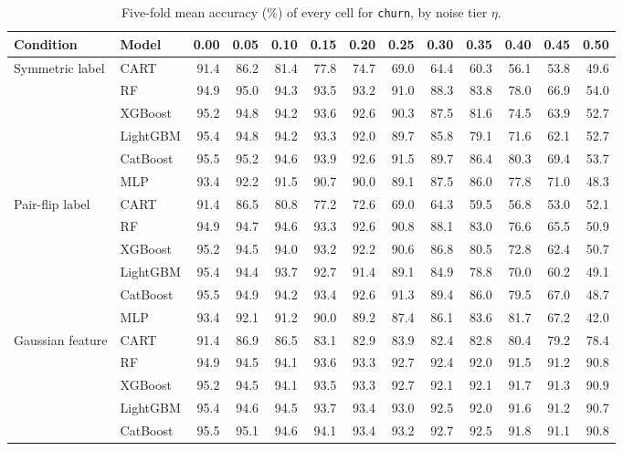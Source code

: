 \begin{table}[p]
\centering
\tiny
\setlength{\tabcolsep}{2.6pt}
\caption{Five-fold mean accuracy (\%) of every cell for \texttt{churn}, by noise tier $\eta$.}
\label{tab:grid_churn}
\begin{tabular}{@{}llrrrrrrrrrrr@{}}
\toprule
Condition & Model & 0.00 & 0.05 & 0.10 & 0.15 & 0.20 & 0.25 & 0.30 & 0.35 & 0.40 & 0.45 & 0.50 \\
\midrule
Symmetric label & CART & 91.4 & 86.2 & 81.4 & 77.8 & 74.7 & 69.0 & 64.4 & 60.3 & 56.1 & 53.8 & 49.6 \\
 & RF & 94.9 & 95.0 & 94.3 & 93.5 & 93.2 & 91.0 & 88.3 & 83.8 & 78.0 & 66.9 & 54.0 \\
 & XGBoost & 95.2 & 94.8 & 94.2 & 93.6 & 92.6 & 90.3 & 87.5 & 81.6 & 74.5 & 63.9 & 52.7 \\
 & LightGBM & 95.4 & 94.8 & 94.2 & 93.3 & 92.0 & 89.7 & 85.8 & 79.1 & 71.6 & 62.1 & 52.7 \\
 & CatBoost & 95.5 & 95.2 & 94.6 & 93.9 & 92.6 & 91.5 & 89.7 & 86.4 & 80.3 & 69.4 & 53.7 \\
 & MLP & 93.4 & 92.2 & 91.5 & 90.7 & 90.0 & 89.1 & 87.5 & 86.0 & 77.8 & 71.0 & 48.3 \\
\midrule
Pair-flip label & CART & 91.4 & 86.5 & 80.8 & 77.2 & 72.6 & 69.0 & 64.3 & 59.5 & 56.8 & 53.0 & 52.1 \\
 & RF & 94.9 & 94.7 & 94.6 & 93.3 & 92.6 & 90.8 & 88.1 & 83.0 & 76.6 & 65.5 & 50.9 \\
 & XGBoost & 95.2 & 94.5 & 94.0 & 93.2 & 92.2 & 90.6 & 86.8 & 80.5 & 72.8 & 62.4 & 50.7 \\
 & LightGBM & 95.4 & 94.4 & 93.7 & 92.7 & 91.4 & 89.1 & 84.9 & 78.8 & 70.0 & 60.2 & 49.1 \\
 & CatBoost & 95.5 & 94.9 & 94.2 & 93.4 & 92.6 & 91.3 & 89.4 & 86.0 & 79.5 & 67.0 & 48.7 \\
 & MLP & 93.4 & 92.1 & 91.2 & 90.0 & 89.2 & 87.4 & 86.1 & 83.6 & 81.7 & 67.2 & 42.0 \\
\midrule
Gaussian feature & CART & 91.4 & 86.9 & 86.5 & 83.1 & 82.9 & 83.9 & 82.4 & 82.8 & 80.4 & 79.2 & 78.4 \\
 & RF & 94.9 & 94.5 & 94.1 & 93.6 & 93.3 & 92.7 & 92.4 & 92.0 & 91.5 & 91.2 & 90.8 \\
 & XGBoost & 95.2 & 94.5 & 94.1 & 93.5 & 93.3 & 92.7 & 92.1 & 92.1 & 91.7 & 91.3 & 90.9 \\
 & LightGBM & 95.4 & 94.6 & 94.5 & 93.7 & 93.4 & 93.0 & 92.5 & 92.0 & 91.6 & 91.2 & 90.7 \\
 & CatBoost & 95.5 & 95.1 & 94.6 & 94.1 & 93.4 & 93.2 & 92.7 & 92.5 & 91.8 & 91.1 & 90.8 \\

\end{tabular}
\end{table}
